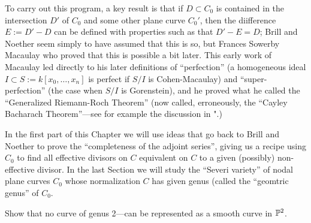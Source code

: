 To carry out this program, a key result is that if $D\subset C_0$ is contained in the intersection
$D'$ of $C_0$ and some other plane curve $C_0'$, then the diifference 
$E := D'-D$ can be defined with properties such as that $D'-E = D$; Brill and Noether seem simply to have assumed that this is so, but Frances Sowerby Macaulay who proved that this is possible a bit later. This early work of Macaulay led directly to his later definitions of  ``perfection'' (a homogeneous ideal
$I  \subset S:= k[x_0, \dots, x_n]$ is perfect if $S/I$ is Cohen-Macaulay) and ``super-perfection'' (the case when $S/I$ is
Gorenstein), and he proved what he called the ``Generalized Riemann-Roch Theorem'' (now called, erroneously, the ``Cayley Bacharach Theorem''---see for example the discussion in "\cite{Eisenbud-Gray}.)

In the first part of this Chapter we will use ideas that go back to Brill and Noether to prove the ``completeness of the adjoint series'', giving us a recipe using $C_0$ to find all effective divisors on $C$ equivalent on $C$ to a given (possibly) non-effective divisor. In the last Section we will study the ``Severi variety'' of nodal plane curves $C_0$ whose normalization $C$ has given genus (called the 
``geomtric genus'' of $C_0$.

\begin{exercise}
 Show that no curve of genus 2---can be represented as a smooth curve in ${\mathbb P}^2$.
\end{exercise}


%


